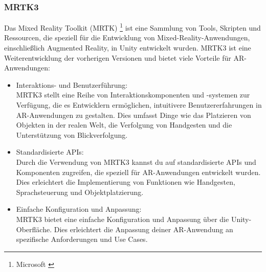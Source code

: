 \subsubsection{MRTK3}
Das Mixed Reality Toolkit (MRTK) \footnote{Microsoft \cite{MRTK3}} ist eine Sammlung von Tools,
Skripten und Ressourcen, die speziell für die Entwicklung von Mixed-Reality-Anwendungen, einschließlich Augmented
Reality, in Unity entwickelt wurden. MRTK3 ist eine Weiterentwicklung der vorherigen Versionen und bietet viele
Vorteile für AR-Anwendungen:
\begin{itemize}
    \item Interaktions- und Benutzerführung: \\
    MRTK3 stellt eine Reihe von Interaktionskomponenten und -systemen zur
    Verfügung, die es Entwicklern ermöglichen, intuitivere Benutzererfahrungen in AR-Anwendungen zu gestalten.
    Dies umfasst Dinge wie das Platzieren von Objekten in der realen Welt, die Verfolgung von Handgesten und die
    Unterstützung von Blickverfolgung.
    \item Standardisierte APIs: \\
    Durch die Verwendung von MRTK3 kannst du auf standardisierte APIs und Komponenten
    zugreifen, die speziell für AR-Anwendungen entwickelt wurden. Dies erleichtert die Implementierung von Funktionen
    wie Handgesten, Sprachsteuerung und Objektplatzierung.
    \item Einfache Konfiguration und Anpassung: \\
    MRTK3 bietet eine einfache Konfiguration und Anpassung über die
    Unity-Oberfläche. Dies erleichtert die Anpassung deiner AR-Anwendung an spezifische Anforderungen und Use Cases.
\end{itemize}

